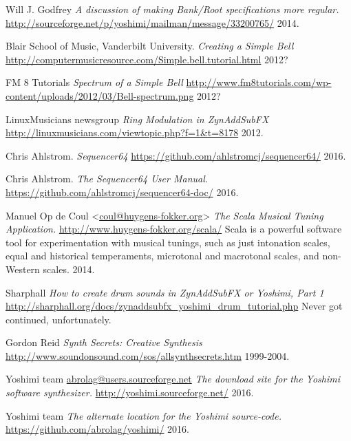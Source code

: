\begin{thebibliography}{99}

   Will J. Godfrey
   \emph{A discussion of making Bank/Root specifications more regular.}
   \url{http://sourceforge.net/p/yoshimi/mailman/message/33200765/}
   2014.

   Blair School of Music, Vanderbilt University.
   \emph{Creating a Simple Bell}
   \url{http://computermusicresource.com/Simple.bell.tutorial.html}
   2012?

   FM 8 Tutorials
   \emph{Spectrum of a Simple Bell}
   \url{http://www.fm8tutorials.com/wp-content/uploads/2012/03/Bell-spectrum.png}
   2012?

   LinuxMusicians newsgroup
   \emph{Ring Modulation in ZynAddSubFX}
   \url{http://linuxmusicians.com/viewtopic.php?f=1&t=8178}
   2012.

   Chris Ahlstrom.
   \emph{Sequencer64}
   \url{https://github.com/ahlstromcj/sequencer64/}
   2016.

   Chris Ahlstrom.
   \emph{The Sequencer64 User Manual.}
   \url{https://github.com/ahlstromcj/sequencer64-doc/}
   2016.

   Manuel Op de Coul <\url{coul@huygens-fokker.org}>
   \emph{The Scala Musical Tuning Application.}
   \url{http://www.huygens-fokker.org/scala/}
   Scala is a powerful software tool for experimentation with musical
   tunings, such as just intonation scales, equal and historical
   temperaments, microtonal and macrotonal scales, and non-Western scales.
   2014.

   Sharphall
   \emph{How to create drum sounds in ZynAddSubFX or Yoshimi, Part 1}
   \url{http://sharphall.org/docs/zynaddsubfx\_yoshimi\_drum\_tutorial.php}
   Never got continued, unfortunately.

   Gordon Reid
   \emph{Synth Secrets:  Creative Synthesis}
   \url{http://www.soundonsound.com/sos/allsynthsecrets.htm}
   1999-2004.

   Yoshimi team \url{abrolag@users.sourceforge.net}
   \emph{The download site for the Yoshimi software synthesizer.}
   \url{http://yoshimi.sourceforge.net/}
   2016.

   Yoshimi team
   \emph{The alternate location for the Yoshimi source-code.}
   \url{https://github.com/abrolag/yoshimi/}
   2016.


\end{thebibliography}
